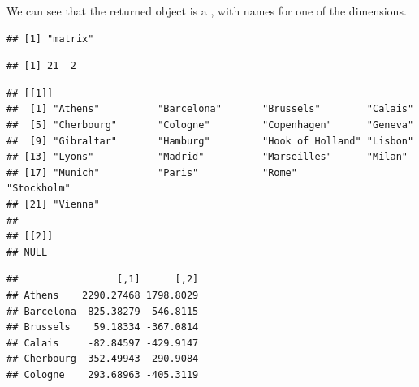 \documentclass[krantz2]{krantz}\usepackage{knitr}
\begin{document}
\begin{knitrout}\footnotesize
{}\color{fgcolor}\begin{kframe}
\begin{alltt}
 \hlkwb{<-} 
\end{alltt}
\end{kframe}
\end{knitrout}

We can see that the returned object  is a , with names for one of the dimensions.

\begin{knitrout}\footnotesize
{}\color{fgcolor}\begin{kframe}
\begin{alltt}
\end{alltt}
\begin{verbatim}
## [1] "matrix"
\end{verbatim}
\begin{alltt}
\end{alltt}
\begin{verbatim}
## [1] 21  2
\end{verbatim}
\begin{alltt}
\end{alltt}
\begin{verbatim}
## [[1]]
##  [1] "Athens"          "Barcelona"       "Brussels"        "Calais"         
##  [5] "Cherbourg"       "Cologne"         "Copenhagen"      "Geneva"         
##  [9] "Gibraltar"       "Hamburg"         "Hook of Holland" "Lisbon"         
## [13] "Lyons"           "Madrid"          "Marseilles"      "Milan"          
## [17] "Munich"          "Paris"           "Rome"            "Stockholm"      
## [21] "Vienna"         
## 
## [[2]]
## NULL
\end{verbatim}
\begin{alltt}
\end{alltt}
\begin{verbatim}
##                 [,1]      [,2]
## Athens    2290.27468 1798.8029
## Barcelona -825.38279  546.8115
## Brussels    59.18334 -367.0814
## Calais     -82.84597 -429.9147
## Cherbourg -352.49943 -290.9084
## Cologne    293.68963 -405.3119
\end{verbatim}
\end{kframe}
\end{knitrout}
\end{document}
